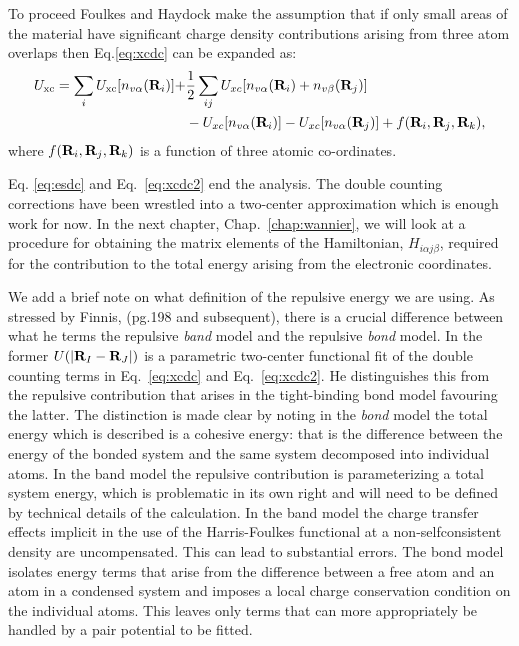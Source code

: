 To proceed Foulkes and Haydock make the assumption that if only small 
areas of the material have significant charge density contributions arising from three atom 
overlaps then Eq.\ref{eq:xcdc} can be expanded as:
%
\begin{align*}
\label{eq:xcdc2}
U_{\rm xc} = \sum_{i} U_{\rm xc}[n_{v\alpha}({\bf R}_{i})] + & \frac{1}{2}\sum_{ij} U_{xc}[n_{v\alpha}({\bf R}_i) + n_{v\beta}({\bf R}_{j})]  \\ 
	     & - U_{xc}[n_{v\alpha}({\bf R}_i)] - U_{xc}[n_{v\alpha}({\bf R}_j)] + f({\bf R}_i,{\bf R}_j,{\bf R}_k),
\end{align*}
%
where $f({\bf R}_i,{\bf R}_j,{\bf R}_k)$ is a function of three atomic co-ordinates.

Eq. \ref{eq:esdc} and Eq.~\ref{eq:xcdc2} end the analysis.
The double counting corrections have been wrestled into a two-center 
approximation which is enough work for now. In the next chapter, Chap.~\ref{chap:wannier},
we will look at a procedure for obtaining the matrix elements of the 
Hamiltonian, $H_{i\alpha j\beta}$, required for the contribution to the total
energy arising from the electronic coordinates.

We add a brief note on what definition of the repulsive energy we are using.
As stressed by Finnis, (pg.198 and subsequent), there is a crucial difference between what he terms the
repulsive \textit{band} model and the repulsive \textit{bond} model. 
In the former $U(|{\bf R}_I - {\bf R}_J|)$ is a parametric two-center 
functional fit of the double counting terms in Eq.~\ref{eq:xcdc} and Eq.~\ref{eq:xcdc2}.
He distinguishes this from the repulsive contribution that arises in the tight-binding bond model\cite{sutton88} 
favouring the latter. The distinction is made clear by noting in the \textit{bond} 
model the total energy which is described
is a cohesive energy: that is the difference between the energy of the bonded system
and the same system decomposed into individual atoms. In the band model the repulsive contribution
is parameterizing a total system energy, which is problematic in its own right and
will need to be defined by technical details of the calculation.
In the band model the charge transfer effects implicit in the use of 
the Harris-Foulkes functional at a non-selfconsistent density 
are uncompensated.  This can lead to substantial errors.
The bond model isolates energy terms that arise from the difference between a free atom and an atom
in a condensed system and imposes a local charge conservation condition on the individual atoms.
This leaves only terms that can more appropriately be handled by a pair potential to be fitted.

